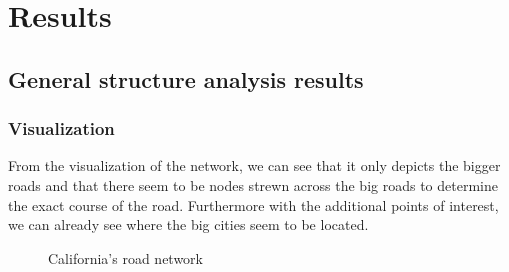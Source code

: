 \documentclass[11pt]{article}
\begin{document}
\section{Results}
\subsection{General structure analysis results}

\subsubsection{Visualization}
From the visualization of the network, we can see that it only depicts the bigger roads and that there seem to be nodes strewn across the big roads to determine the exact course of the road. Furthermore with the additional points of interest, we can already see where the big cities seem to be located. 
\begin{figure}[h!]
    \centering
    \caption{California's road network}%
    \qquad
\end{figure}
\end{document}
